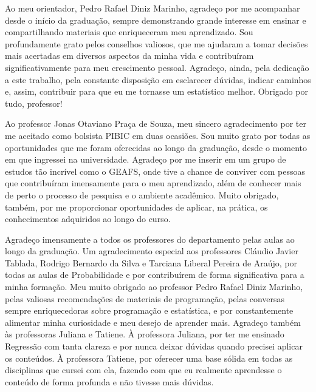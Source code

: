 \documentclass[
  12pt,
  a4paper,
]{scrreprt}
\begin{document}
\vspace{12pt}

Ao meu orientador, Pedro Rafael Diniz Marinho, agradeço por me
acompanhar desde o início da graduação, sempre demonstrando grande
interesse em ensinar e compartilhando materiais que enriqueceram meu
aprendizado. Sou profundamente grato pelos conselhos valiosos, que me
ajudaram a tomar decisões mais acertadas em diversos aspectos da minha
vida e contribuíram significativamente para meu crescimento pessoal.
Agradeço, ainda, pela dedicação a este trabalho, pela constante
disposição em esclarecer dúvidas, indicar caminhos e, assim, contribuir
para que eu me tornasse um estatístico melhor. Obrigado por tudo,
professor!

\vspace{12pt}

Ao professor Jonas Otaviano Praça de Souza, meu sincero agradecimento
por ter me aceitado como bolsista PIBIC em duas ocasiões. Sou muito
grato por todas as oportunidades que me foram oferecidas ao longo da
graduação, desde o momento em que ingressei na universidade. Agradeço
por me inserir em um grupo de estudos tão incrível como o GEAFS, onde
tive a chance de conviver com pessoas que contribuíram imensamente para
o meu aprendizado, além de conhecer mais de perto o processo de pesquisa
e o ambiente acadêmico. Muito obrigado, também, por me proporcionar
oportunidades de aplicar, na prática, os conhecimentos adquiridos ao
longo do curso.

\vspace{12pt}

Agradeço imensamente a todos os professores do departamento pelas aulas
ao longo da graduação. Um agradecimento especial aos professores Cláudio
Javier Tablada, Rodrigo Bernardo da Silva e Tarciana Liberal Pereira de
Araújo, por todas as aulas de Probabilidade e por contribuírem de forma
significativa para a minha formação. Meu muito obrigado ao professor
Pedro Rafael Diniz Marinho, pelas valiosas recomendações de materiais de
programação, pelas conversas sempre enriquecedoras sobre programação e
estatística, e por constantemente alimentar minha curiosidade e meu
desejo de aprender mais. Agradeço também às professoras Juliana e
Tatiene. À professora Juliana, por ter me ensinado Regressão com tanta
clareza e por nunca deixar dúvidas quando precisei aplicar os conteúdos.
À professora Tatiene, por oferecer uma base sólida em todas as
disciplinas que cursei com ela, fazendo com que eu realmente aprendesse
o conteúdo de forma profunda e não tivesse mais dúvidas.
\end{document}
